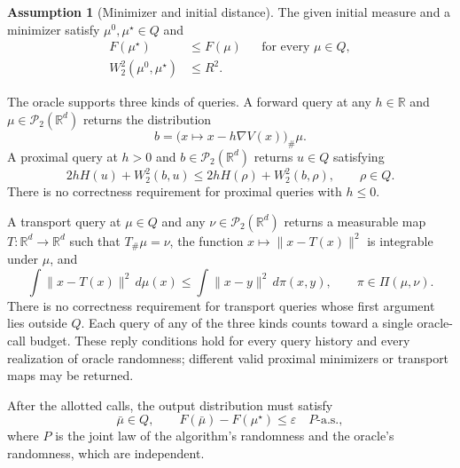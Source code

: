 \documentclass[10pt]{article}
\theoremstyle{definition}
\newtheorem{assumption}{Assumption}
\begin{document}
\begin{assumption}[Minimizer and initial distance]
The given initial measure and a minimizer satisfy $\mu^0,\mu^\star\in Q$ and
\[
\begin{aligned}
F(\mu^\star)&\leq F(\mu) &&\text{for every }\mu\in Q,\\
W_2^2(\mu^0,\mu^\star)&\leq R^2.
\end{aligned}
\]
\end{assumption}

The oracle supports three kinds of queries. A forward query at any $h\in\mathbb{R}$ and $\mu\in\mathcal{P}_2(\mathbb{R}^d)$ returns the distribution
\[
b=\bigl(x\mapsto x-h\nabla V(x)\bigr)_\#\mu.
\]
A proximal query at $h>0$ and $b\in\mathcal{P}_2(\mathbb{R}^d)$ returns $u\in Q$ satisfying
\[
2hH(u)+W_2^2(b,u)
\leq 2hH(\rho)+W_2^2(b,\rho),
\qquad \rho\in Q.
\]
There is no correctness requirement for proximal queries with $h\leq0$.

A transport query at $\mu\in Q$ and any $\nu\in\mathcal{P}_2(\mathbb{R}^d)$ returns a measurable map $T:\mathbb{R}^d\to\mathbb{R}^d$ such that $T_\#\mu=\nu$, the function $x\mapsto\|x-T(x)\|^2$ is integrable under $\mu$, and
\[
\int\|x-T(x)\|^2\,d\mu(x)
\leq\int\|x-y\|^2\,d\pi(x,y),
\qquad \pi\in\Pi(\mu,\nu).
\]
There is no correctness requirement for transport queries whose first argument lies outside $Q$. Each query of any of the three kinds counts toward a single oracle-call budget. These reply conditions hold for every query history and every realization of oracle randomness; different valid proximal minimizers or transport maps may be returned.

After the allotted calls, the output distribution must satisfy
\[
\bar\mu\in Q,
\qquad
F(\bar\mu)-F(\mu^\star)\leq\varepsilon
\quad P\text{-a.s.},
\]
where $P$ is the joint law of the algorithm's randomness and the oracle's randomness, which are independent.
\end{document}
